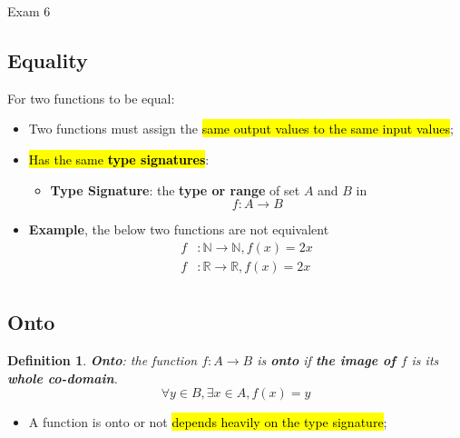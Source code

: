 \documentclass{note}
\newtheorem{definition}{Definition}
\begin{document}
\begin{note}{Exam 6}
        \subsection{Equality}

        For two functions to be equal:
        \begin{itemize}
            \item Two functions must assign the \hl{same output values to the same input values};
            \item \hl{Has the same \textbf{type signatures}}:
            \begin{itemize}
                \item \textbf{Type Signature}: the \textbf{type or range} of set $ A $ and $ B $ in
                \begin{displaymath}
                    f : A \to B
                \end{displaymath}
            \end{itemize}

            \item \textbf{Example}, the below two functions are not equivalent
            \begin{align*}
                f &: \mathbb{N} \to \mathbb{N}, f(x) = 2x\\
                f &: \mathbb{R} \to \mathbb{R}, f(x) = 2x\\
            \end{align*}
        \end{itemize}

        \subsection{Onto}

        \begin{definition}
            \textbf{Onto}: the function $ f: A \to B $ is \textbf{onto} if \textbf{the image of $ f $} is its \textbf{whole co-domain}.
            \begin{equation}\label{eq: definition of onto}
                \forall y \in B, \exists x \in A, f(x) = y
            \end{equation}
        \end{definition}

        \begin{itemize}
            \item A function is onto or not \hl{depends heavily on the type signature};
        \end{itemize}


\end{note}
\end{document}
